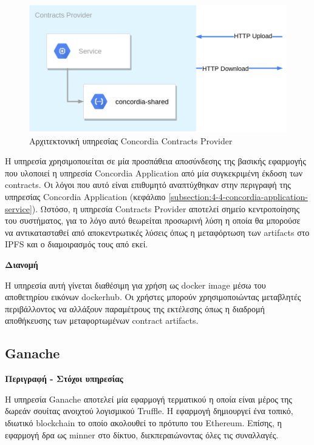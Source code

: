 \begin{figure}[H]
    \centering
    \includegraphics[width=.6\textwidth]{assets/figures/chapter-4/4.4.architecture-4.4.5.concordia-contracts-provider-architecture.png}
    \caption{Αρχιτεκτονική υπηρεσίας Concordia Contracts Provider}
    \label{figure:4-4-concordia-contracts-provider-architecture}
\end{figure}

Η υπηρεσία χρησιμοποιείται σε μία προσπάθεια αποσύνδεσης της βασικής εφαρμογής που υλοποιεί η υπηρεσία Concordia Application από μία συγκεκριμένη έκδοση των contracts. Οι λόγοι που αυτό είναι επιθυμητό αναπτύχθηκαν στην περιγραφή της υπηρεσίας Concordia \textenglish{Application} (κεφάλαιο \ref{subsection:4-4-concordia-application-service}). Ωστόσο, η υπηρεσία Contracts Provider αποτελεί σημείο κεντροποίησης του συστήματος, για το λόγο αυτό θεωρείται προσωρινή λύση η οποία θα μπορούσε να αντικατασταθεί από αποκεντρωτικές λύσεις όπως η μεταφόρτωση των artifacts στο IPFS και ο διαμοιρασμός τους από εκεί.

\vspace{0.5cm}
\textbf{Διανομή}

Η υπηρεσία αυτή γίνεται διαθέσιμη για χρήση ως docker image μέσω του αποθετηρίου εικόνων dockerhub. Οι χρήστες μπορούν χρησιμοποιώντας μεταβλητές περιβάλλοντος να αλλάξουν παραμέτρους της εκτέλεσης όπως η διαδρομή αποθήκευσης των μεταφορτωμένων contract artifacts.

\subsection{Ganache} \label{subsection:4-4-ganache-service}

\vspace{0.5cm}
\textbf{Περιγραφή - Στόχοι υπηρεσίας}

Η υπηρεσία Ganache αποτελεί μία εφαρμογή τερματικού η οποία είναι μέρος της δωρεάν σουίτας ανοιχτού λογισμικού Truffle. Η εφαρμογή δημιουργεί ένα τοπικό, ιδιωτικό blockchain το οποίο ακολουθεί το πρότυπο του Ethereum. Επίσης, η εφαρμογή δρα ως minner στο δίκτυο, διεκπεραιώνοντας όλες τις συναλλαγές.

